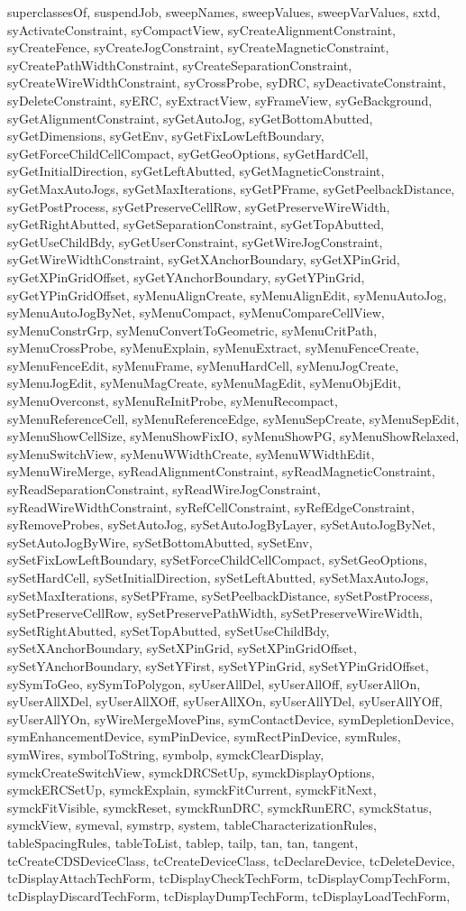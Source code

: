 {{superclassesOf, suspendJob, sweepNames, sweepValues, sweepVarValues, sxtd, syActivateConstraint, syCompactView, syCreateAlignmentConstraint, syCreateFence, syCreateJogConstraint, syCreateMagneticConstraint, syCreatePathWidthConstraint, syCreateSeparationConstraint, syCreateWireWidthConstraint, syCrossProbe, syDRC, syDeactivateConstraint, syDeleteConstraint, syERC, syExtractView, syFrameView, syGeBackground, syGetAlignmentConstraint, syGetAutoJog, syGetBottomAbutted, syGetDimensions, syGetEnv, syGetFixLowLeftBoundary, syGetForceChildCellCompact, syGetGeoOptions, syGetHardCell, syGetInitialDirection, syGetLeftAbutted, syGetMagneticConstraint, syGetMaxAutoJogs, syGetMaxIterations, syGetPFrame, syGetPeelbackDistance, syGetPostProcess, syGetPreserveCellRow, syGetPreserveWireWidth, syGetRightAbutted, syGetSeparationConstraint, syGetTopAbutted, syGetUseChildBdy, syGetUserConstraint, syGetWireJogConstraint, syGetWireWidthConstraint, syGetXAnchorBoundary, syGetXPinGrid, syGetXPinGridOffset, syGetYAnchorBoundary, syGetYPinGrid, syGetYPinGridOffset, syMenuAlignCreate, syMenuAlignEdit, syMenuAutoJog, syMenuAutoJogByNet, syMenuCompact, syMenuCompareCellView, syMenuConstrGrp, syMenuConvertToGeometric, syMenuCritPath, syMenuCrossProbe, syMenuExplain, syMenuExtract, syMenuFenceCreate, syMenuFenceEdit, syMenuFrame, syMenuHardCell, syMenuJogCreate, syMenuJogEdit, syMenuMagCreate, syMenuMagEdit, syMenuObjEdit, syMenuOverconst, syMenuReInitProbe, syMenuRecompact, syMenuReferenceCell, syMenuReferenceEdge, syMenuSepCreate, syMenuSepEdit, syMenuShowCellSize, syMenuShowFixIO, syMenuShowPG, syMenuShowRelaxed, syMenuSwitchView, syMenuWWidthCreate, syMenuWWidthEdit, syMenuWireMerge, syReadAlignmentConstraint, syReadMagneticConstraint, syReadSeparationConstraint, syReadWireJogConstraint, syReadWireWidthConstraint, syRefCellConstraint, syRefEdgeConstraint, syRemoveProbes, sySetAutoJog, sySetAutoJogByLayer, sySetAutoJogByNet, sySetAutoJogByWire, sySetBottomAbutted, sySetEnv, sySetFixLowLeftBoundary, sySetForceChildCellCompact, sySetGeoOptions, sySetHardCell, sySetInitialDirection, sySetLeftAbutted, sySetMaxAutoJogs, sySetMaxIterations, sySetPFrame, sySetPeelbackDistance, sySetPostProcess, sySetPreserveCellRow, sySetPreservePathWidth, sySetPreserveWireWidth, sySetRightAbutted, sySetTopAbutted, sySetUseChildBdy, sySetXAnchorBoundary, sySetXPinGrid, sySetXPinGridOffset, sySetYAnchorBoundary, sySetYFirst, sySetYPinGrid, sySetYPinGridOffset, sySymToGeo, sySymToPolygon, syUserAllDel, syUserAllOff, syUserAllOn, syUserAllXDel, syUserAllXOff, syUserAllXOn, syUserAllYDel, syUserAllYOff, syUserAllYOn, syWireMergeMovePins, symContactDevice, symDepletionDevice, symEnhancementDevice, symPinDevice, symRectPinDevice, symRules, symWires, symbolToString, symbolp, symckClearDisplay, symckCreateSwitchView, symckDRCSetUp, symckDisplayOptions, symckERCSetUp, symckExplain, symckFitCurrent, symckFitNext, symckFitVisible, symckReset, symckRunDRC, symckRunERC, symckStatus, symckView, symeval, symstrp, system, tableCharacterizationRules, tableSpacingRules, tableToList, tablep, tailp, tan, tan, tangent, tcCreateCDSDeviceClass, tcCreateDeviceClass, tcDeclareDevice, tcDeleteDevice, tcDisplayAttachTechForm, tcDisplayCheckTechForm, tcDisplayCompTechForm, tcDisplayDiscardTechForm, tcDisplayDumpTechForm, tcDisplayLoadTechForm, }}
